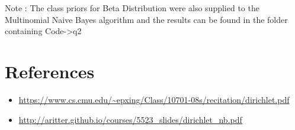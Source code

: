 \documentclass[paper=a4, fontsize=11pt]{scrartcl}
\numberwithin{equation}{section}		%
\numberwithin{figure}{section}			%
\numberwithin{table}{section}				%
\begin{document}
Note : The class priors for Beta Distribution were also supplied to the Multinomial Naive Bayes algorithm and the results can be found in the folder containing Code->q2

\section*{References}
\begin{itemize}
\item \url{https://www.cs.cmu.edu/~epxing/Class/10701-08s/recitation/dirichlet.pdf}
\item \url{http://aritter.github.io/courses/5523_slides/dirichlet_nb.pdf}
\end{itemize}
\end{document}

